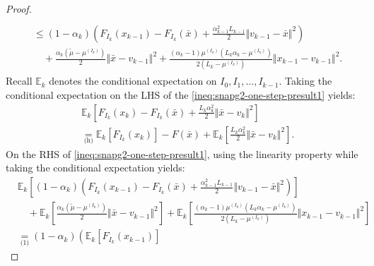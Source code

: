 \documentclass[12pt]{article}
\begin{document}
\begin{proof}
\begin{align}
\begin{split}
                \\ &\le 
                (1 - \alpha_k)\left(
                    F_{I_k}(x_{k - 1}) - F_{I_k}(\bar x) + \frac{\alpha_{k - 1}^2L_{k - 1}}{2}\Vert v_{k - 1} - \bar x\Vert^2
                \right) 
                    \\ &\quad 
                    + \frac{\alpha_k(\tilde \mu - \mu^{(I_k)})}{2} \Vert \bar x - v_{k - 1}\Vert^2
                    + \frac{(\alpha_k - 1)\mu^{(I_k)}\left(L_k\alpha_k - \mu^{(I_k)}\right)}{2\left(L_k - \mu^{(I_k)}\right)}\Vert x_{k - 1} - v_{k - 1} \Vert^2. 
            \end{split}
        \label{ineq:snapg2-one-step-presult1}\end{align}
        Recall $\mathbb E_k$ denotes the conditional expectation on $I_0, I_1, \ldots, I_{k - 1}$. 
        Taking the conditional expectation on the LHS of the \eqref{ineq:snapg2-one-step-presult1} yields: 
        \begin{align*}
            & \mathbb E_k\left[
                F_{I_k}(x_{k}) - F_{I_k}(\bar x) + \frac{L_k\alpha_k^2}{2}\Vert \bar x - v_k\Vert^2 
            \right]
            \\
            &\underset{\text{(h)}}{=}
            \mathbb E_k\left[F_{I_k}(x_{k})\right] 
            - F(\bar x) 
            + \mathbb E_k\left[
                \frac{L_k\alpha_k^2}{2}\Vert \bar x - v_k\Vert^2 
            \right]. 
        \end{align*}
        On the RHS of \eqref{ineq:snapg2-one-step-presult1}, using the linearity property while taking the conditional expectation yields: 
        {\allowdisplaybreaks
        \begin{align*}
            & \mathbb E_k\left[
                (1 - \alpha_k)\left(
                    F_{I_k}(x_{k - 1}) - F_{I_k}(\bar x) + \frac{\alpha_{k - 1}^2L_{k - 1}}{2}\Vert v_{k - 1} - \bar x\Vert^2
                \right)
            \right]
                \\ &\quad 
                + \mathbb E_k \left[
                    \frac{\alpha_k(\tilde\mu - \mu^{(I_k)})}{2} \Vert \bar x - v_{k - 1}\Vert^2
                \right]
                + \mathbb E_k\left[
                    \frac{(\alpha_k - 1)\mu^{(I_k)}\left(L_k\alpha_k - \mu^{(I_k)}\right)}{2\left(L_k - \mu^{(I_k)}\right)}\Vert x_{k - 1} - v_{k - 1} \Vert^2
                \right]
            \\
            &\underset{\text{(1)}}{=} 
            (1 - \alpha_k)\left(
                    \mathbb E_k \left[F_{I_k}(x_{k - 1})\right] 

\end{align*}}
\end{proof}
\end{document}
